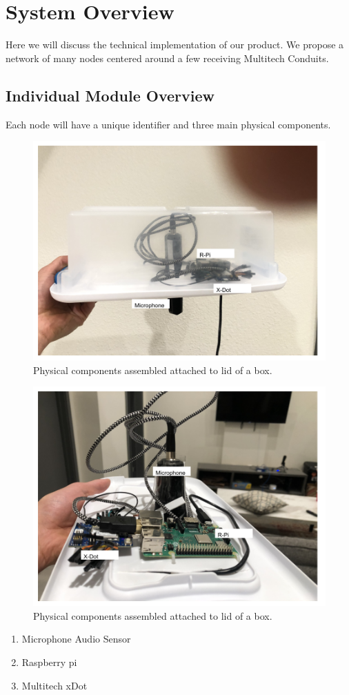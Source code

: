 \documentclass[conference]{IEEEtran}
\begin{document}
\section{System Overview}

Here we will discuss the technical implementation of our product. We propose a network of many nodes centered around a few receiving Multitech Conduits.



\subsection{Individual Module Overview}

Each node will have a unique identifier and three main physical components.
\begin{figure}[htbp]
\centerline{\includegraphics[width=0.7\columnwidth]{physical_system_box.png}}
\caption{Physical components assembled attached to lid of a box.}
\label{fig}
\end{figure}
\begin{figure}[htbp]
\centerline{\includegraphics[width=0.7\columnwidth]{physical_system.png}}
\caption{Physical components assembled attached to lid of a box.}
\label{fig}
\end{figure}
\begin{enumerate}
\item Microphone Audio Sensor 
\item Raspberry pi
\item Multitech xDot

\end{enumerate}
\end{document}
